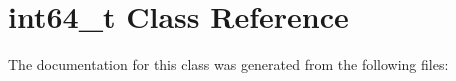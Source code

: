 \hypertarget{classint64__t}{}\section{int64\+\_\+t Class Reference}
\label{classint64__t}


The documentation for this class was generated from the following files\+: